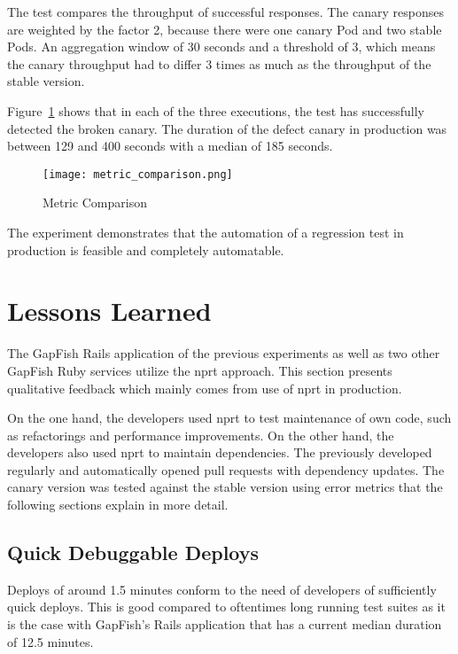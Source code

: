 The test compares the throughput of successful responses. The canary responses are weighted by
the factor 2, because there were one canary Pod and two stable Pods. An aggregation window
of 30 seconds and a threshold of 3, which means the canary throughput had to differ 3 times
as much as the throughput of the stable version.

Figure~\ref{fig:metric_comparison} shows that in each of the three executions, the test
has successfully detected the broken canary. The duration of the defect canary in
production was between 129 and 400 seconds with a median of 185 seconds.

\begin{figure}[htbp]
  \centering
  \texttt{[image: metric\_comparison.png]}
  \caption{Metric Comparison}
  \label{fig:metric_comparison}
\end{figure}

The experiment demonstrates that the automation of a regression test in production is
feasible and completely automatable.

\section{Lessons Learned}

The GapFish Rails application of the previous experiments as well as two other
GapFish Ruby services utilize the \gls{nprt} approach. This section presents
qualitative feedback which mainly comes from use of \gls{nprt} in production.

On the one hand, the developers used \gls{nprt} to test maintenance of own code,
such as refactorings and performance improvements. On the other hand, the developers also used \gls{nprt} to maintain dependencies. The previously developed \gemupdater{} regularly and
automatically opened pull requests with dependency updates. The canary version was tested against the stable version using
error metrics that the following sections explain in more detail.

\subsection{Quick Debuggable Deploys}

Deploys of around 1.5 minutes conform to the need of developers of sufficiently quick
deploys. This is good compared to oftentimes long running test suites as it is the case with
GapFish's Rails application that has a current median duration of 12.5 minutes.

